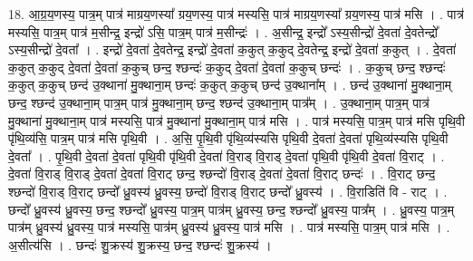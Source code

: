 \documentclass[17pt]{extarticle}
\begin{document}
18. आ॒ग्र॒य॒णस्य॒ पात्र॒म् पात्र॑ माग्रय॒णस्या᳚ ग्रय॒णस्य॒ पात्र॑ मस्यसि॒ पात्र॑ माग्रय॒णस्या᳚ ग्रय॒णस्य॒ पात्र॑ मसि । . पात्र॑ मस्यसि॒ पात्र॒म् पात्र॑ म॒सीन्द्र॒ इन्द्रो॑ ऽसि॒ पात्र॒म् पात्र॑ म॒सीन्द्रः॑ । . अ॒सीन्द्र॒ इन्द्रो᳚ ऽस्य॒सीन्द्रो॑ दे॒वता॑ दे॒वतेन्द्रो᳚ ऽस्य॒सीन्द्रो॑ दे॒वता᳚ । . इन्द्रो॑ दे॒वता॑ दे॒वतेन्द्र॒ इन्द्रो॑ दे॒वता॑ क॒कुत् क॒कुद् दे॒वतेन्द्र॒ इन्द्रो॑ दे॒वता॑ क॒कुत् । . दे॒वता॑ क॒कुत् क॒कुद् दे॒वता॑ दे॒वता॑ क॒कुच् छन्द॒ श्छन्दः॑ क॒कुद् दे॒वता॑ दे॒वता॑ क॒कुच् छन्दः॑ । . क॒कुच् छन्द॒ श्छन्दः॑ क॒कुत् क॒कुच् छन्द॑ उ॒क्थाना॑ मु॒क्थाना॒म् छन्दः॑ क॒कुत् क॒कुच् छन्द॑ उ॒क्थाना᳚म् । . छन्द॑ उ॒क्थाना॑ मु॒क्थाना॒म् छन्द॒ श्छन्द॑ उ॒क्थाना॒म् पात्र॒म् पात्र॑ मु॒क्थाना॒म् छन्द॒ श्छन्द॑ उ॒क्थाना॒म् पात्र᳚म् । . उ॒क्थाना॒म् पात्र॒म् पात्र॑ मु॒क्थाना॑ मु॒क्थाना॒म् पात्र॑ मस्यसि॒ पात्र॑ मु॒क्थाना॑ मु॒क्थाना॒म् पात्र॑ मसि । . पात्र॑ मस्यसि॒ पात्र॒म् पात्र॑ मसि पृथि॒वी पृ॑थि॒व्य॑सि॒ पात्र॒म् पात्र॑ मसि पृथि॒वी । . अ॒सि॒ पृ॒थि॒वी पृ॑थि॒व्य॑स्यसि पृथि॒वी दे॒वता॑ दे॒वता॑ पृथि॒व्य॑स्यसि पृथि॒वी दे॒वता᳚ । . पृ॒थि॒वी दे॒वता॑ दे॒वता॑ पृथि॒वी पृ॑थि॒वी दे॒वता॑ वि॒राड् वि॒राड् दे॒वता॑ पृथि॒वी पृ॑थि॒वी दे॒वता॑ वि॒राट् । . दे॒वता॑ वि॒राड् वि॒राड् दे॒वता॑ दे॒वता॑ वि॒राट् छन्द॒ श्छन्दो॑ वि॒राड् दे॒वता॑ दे॒वता॑ वि॒राट् छन्दः॑ । . वि॒राट् छन्द॒ श्छन्दो॑ वि॒राड् वि॒राट् छन्दो᳚ ध्रु॒वस्य॑ ध्रु॒वस्य॒ छन्दो॑ वि॒राड् वि॒राट् छन्दो᳚ ध्रु॒वस्य॑ । . वि॒राडिति॑ वि - राट् । . छन्दो᳚ ध्रु॒वस्य॑ ध्रु॒वस्य॒ छन्द॒ श्छन्दो᳚ ध्रु॒वस्य॒ पात्र॒म् पात्र॑म् ध्रु॒वस्य॒ छन्द॒ श्छन्दो᳚ ध्रु॒वस्य॒ पात्र᳚म् । . ध्रु॒वस्य॒ पात्र॒म् पात्र॑म् ध्रु॒वस्य॑ ध्रु॒वस्य॒ पात्र॑ मस्यसि॒ पात्र॑म् ध्रु॒वस्य॑ ध्रु॒वस्य॒ पात्र॑ मसि । . पात्र॑ मस्यसि॒ पात्र॒म् पात्र॑ मसि । . अ॒सीत्य॑सि । . छन्दः॑ शु॒क्रस्य॑ शु॒क्रस्य॒ छन्द॒ श्छन्दः॑ शु॒क्रस्य॑ । \newline
\end{document}
